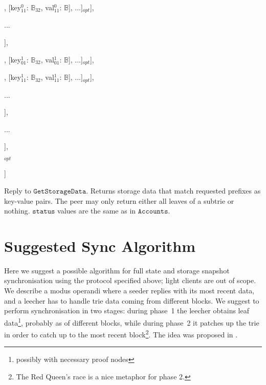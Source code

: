 \documentclass{amsart}
\begin{document}
\quad \qquad [status$^0_1$: $\mathbb{N}$, [[key$^0_{10}$: $\mathbb{B}_{32}$, val$^0_{10}$: $\mathbb{B}$], [key$^0_{11}$: $\mathbb{B}_{32}$, val$^0_{11}$: $\mathbb{B}$], ...]$_{opt}$],

\quad \qquad ...

\qquad ],

\qquad [

\quad \qquad [status$^1_0$: $\mathbb{N}$, [[key$^1_{00}$: $\mathbb{B}_{32}$, val$^1_{00}$: $\mathbb{B}$], [key$^1_{01}$: $\mathbb{B}_{32}$, val$^1_{01}$: $\mathbb{B}$], ...]$_{opt}$],

\quad \qquad [status$^1_1$: $\mathbb{N}$, [[key$^1_{10}$: $\mathbb{B}_{32}$, val$^1_{10}$: $\mathbb{B}$], [key$^1_{11}$: $\mathbb{B}_{32}$, val$^1_{11}$: $\mathbb{B}$], ...]$_{opt}$],

\quad \qquad ...

\qquad ],

\qquad ...

\quad ],

$_{opt}$

]
\medskip

Reply to $\texttt{GetStorageData}$.
Returns storage data that match requested prefixes as key-value pairs.
The peer may only return either all leaves of a subtrie or nothing.
$\texttt{status}$ values are the same as in $\texttt{Accounts}$.

\section{Suggested Sync Algorithm}

Here we suggest a possible algorithm for full state and storage snapshot synchronisation using the protocol specified above;
light clients are out of scope.
We describe a modus operandi where a seeder replies with its most recent data,
and a leecher has to handle trie data coming from different blocks.
We suggest to perform synchronisation in two stages:
during phase~1 the leecher obtains leaf data\footnote{possibly with necessary proof nodes},
probably as of different blocks,
while during phase~2 it patches up the trie in order to catch up to the most recent block\footnote{The
Red Queen's race is a nice metaphor for phase 2.}.
The idea was proposed in \cite{leaf_sync}.
\end{document}
